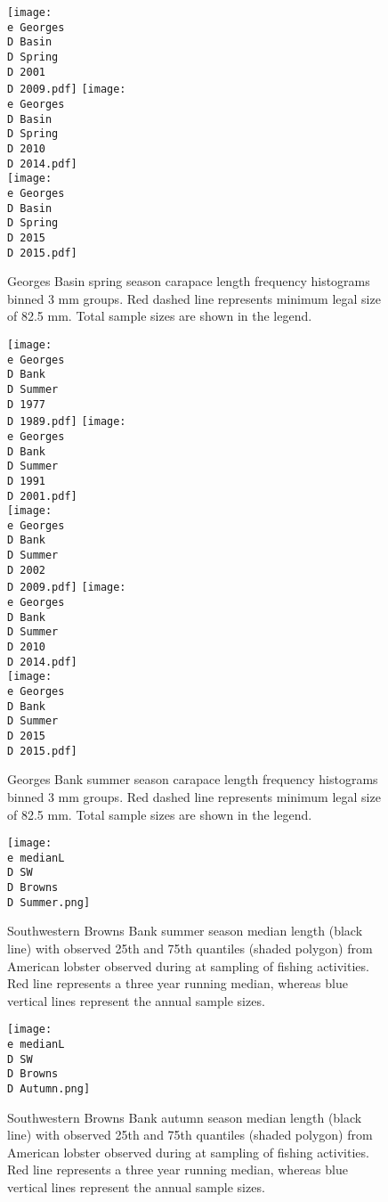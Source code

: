 \documentclass[11pt]{article}
\newcommand{\D}{.}
\newcommand{\e}{/backup/bio_data/bio.lobster/figures/} %
\begin{document}
\begin{figure}
\centering
    \texttt{[image: \\e Georges\\D Basin\\D Spring\\D 2001\\D 2009.pdf]}
    \texttt{[image: \\e Georges\\D Basin\\D Spring\\D 2010\\D 2014.pdf]}\\
    \texttt{[image: \\e Georges\\D Basin\\D Spring\\D 2015\\D 2015.pdf]}
    
    \caption{Georges Basin spring season carapace length frequency histograms binned 3 mm groups. Red dashed line represents minimum legal size of 82.5 mm. Total sample sizes are shown in the legend.}

\end{figure}


\begin{figure}
\centering
    \texttt{[image: \\e Georges\\D Bank\\D Summer\\D 1977\\D 1989.pdf]}
    \texttt{[image: \\e Georges\\D Bank\\D Summer\\D 1991\\D 2001.pdf]}\\
    \texttt{[image: \\e Georges\\D Bank\\D Summer\\D 2002\\D 2009.pdf]}
    \texttt{[image: \\e Georges\\D Bank\\D Summer\\D 2010\\D 2014.pdf]}\\
    \texttt{[image: \\e Georges\\D Bank\\D Summer\\D 2015\\D 2015.pdf]}\\
    \caption{Georges Bank summer season carapace length frequency histograms binned 3 mm groups. Red dashed line represents minimum legal size of 82.5 mm. Total sample sizes are shown in the legend.}

\end{figure}


\begin{figure}

    \texttt{[image: \\e medianL\\D SW\\D Browns\\D Summer.png]}
    \caption{Southwestern Browns Bank summer season median length (black line) with observed 25th and 75th quantiles (shaded polygon) from American lobster observed during at sampling of fishing activities. Red line represents a three year running median, whereas blue vertical lines represent the annual sample sizes.}

\end{figure}

\begin{figure}

    \texttt{[image: \\e medianL\\D SW\\D Browns\\D Autumn.png]}
    \caption{Southwestern Browns Bank autumn season median length (black line) with observed 25th and 75th quantiles (shaded polygon) from American lobster observed during at sampling of fishing activities. Red line represents a three year running median, whereas blue vertical lines represent the annual sample sizes.}

\end{figure}
\end{document}
